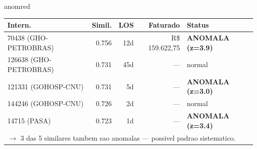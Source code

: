 \documentclass[a4paper,10pt]{article}
\begin{document}
\begin{anomalycard}[Internacao 3674 | GHO-AMIL | CRITICO (z=5.15)]{anomred}
\begin{tabular}{l r r r l}\toprule\textbf{Intern.} & \textbf{Simil.} & \textbf{LOS} & \textbf{Faturado} & \textbf{Status} \\\midrule
70438 (GHO-PETROBRAS) & 0.756 & 12d & R\$ 159.622,75 & \textcolor{anomred}{\textbf{ANOMALA (z=3.9)}} \\
126638 (GHO-PETROBRAS) & 0.731 & 45d & --- & \textcolor{jcubeblue}{normal} \\
121331 (GOHOSP-CNU) & 0.731 & 5d & --- & \textcolor{anomred}{\textbf{ANOMALA (z=3.0)}} \\
144246 (GOHOSP-CNU) & 0.726 & 2d & --- & \textcolor{jcubeblue}{normal} \\
14715 (PASA) & 0.723 & 1d & --- & \textcolor{anomred}{\textbf{ANOMALA (z=3.4)}} \\
\multicolumn{5}{l}{\textcolor{anomred}{\small $\rightarrow$ 3 das 5 similares tambem sao anomalas --- possivel padrao sistematico.}} \\
\bottomrule\end{tabular}


\end{anomalycard}

\newpage
\end{document}
